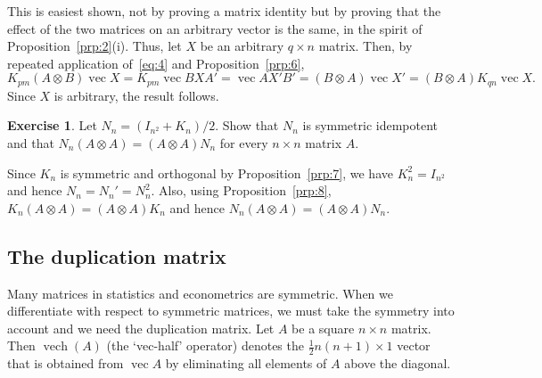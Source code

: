 \documentclass[12pt,a4paper]{article}
\makeatletter
\theoremstyle{definition}
\newtheorem{exercise}{Exercise}
\renewenvironment{proof}[1][\proofname]{\par
  \pushQED{\qed}%
  \normalfont \topsep6\p@\@plus6\p@\relax
  \trivlist
  \item[\hskip\labelsep\bfseries #1\@addpunct{.}]\ignorespaces
}{%
  \popQED\endtrivlist\@endpefalse
}
\newenvironment{solution}{%
  \begin{proof}[Solution]%
}{%
  \end{proof}%
}
\DeclareMathOperator{\vech}{vech}
\DeclareMathOperator{\avec}{vec}
\makeatother
\begin{document}
\begin{proof}
This is easiest shown, not by proving a matrix identity but by proving that the effect of the two matrices on an arbitrary vector is the same, in the spirit of Proposition~\ref{prp:2}(i). Thus, let $X$ be an arbitrary $q \times n$ matrix. Then, by repeated application of~\eqref{eq:4} and Proposition~\ref{prp:6},
\[
K_{pm}(A \otimes B) \avec X = K_{pm} \avec BXA' = \avec AX'B' = (B \otimes A) \avec X' = (B \otimes A) K_{qn} \avec X.
\]
Since $X$ is arbitrary, the result follows. %
\end{proof}

\begin{exercise}\label{exer:5}
Let $N_n = (I_{n^2} + K_n)/2$. Show that $N_n$ is symmetric idempotent and that $N_n(A \otimes A) = (A \otimes A) N_n$ for every $n \times n$ matrix $A$.
\end{exercise}

\begin{solution}
Since $K_n$ is symmetric and orthogonal by Proposition~\ref{prp:7}, we have $K_n^2 = I_{n^2}$ and hence $N_n = N_n' = N_n^2$. Also, using Proposition~\ref{prp:8}, $K_n(A \otimes A) = (A \otimes A)K_n$ and hence $N_n(A \otimes A) = (A \otimes A)N_n$. %
\end{solution}

\subsection{The duplication matrix}\label{sec:2.6}

Many matrices in statistics and econometrics are symmetric. When we differentiate with respect to symmetric matrices, we must take the symmetry into account and we need the duplication matrix. Let $A$ be a square $n \times n$ matrix. Then $\vech(A)$ (the `vec-half' operator) denotes the $\frac{1}{2}n(n+1) \times 1$ vector that is obtained from $\avec A$ by eliminating all elements of $A$ above the diagonal. %
\end{document}

